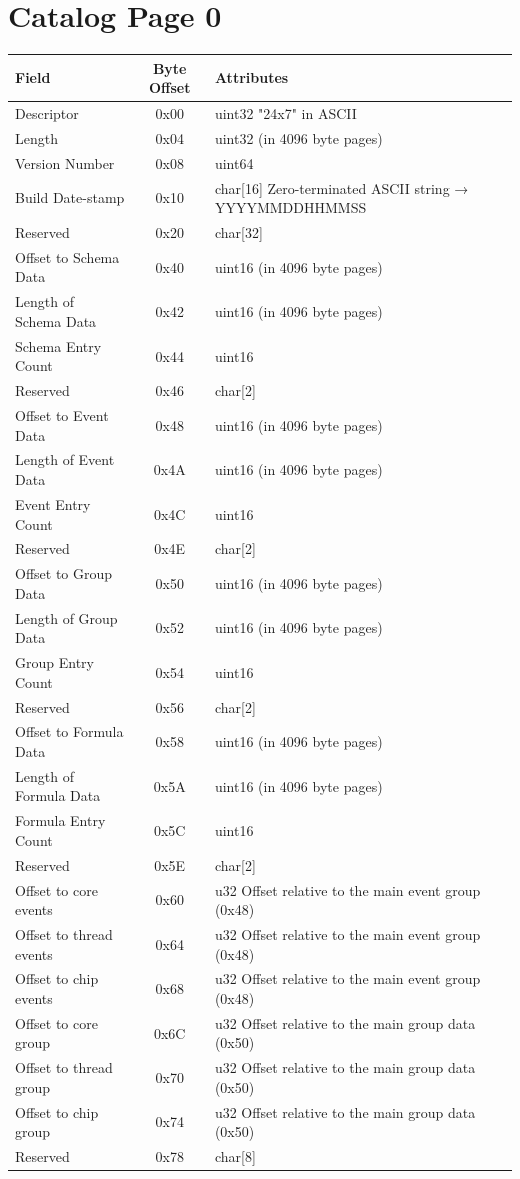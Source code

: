 \documentclass[14]{article}
\begin{document}
\section{Catalog Page 0}
\begin{tabular}[l]{|p{5cm}|c|p{7cm}|}
\hline
\textbf{Field} & \textbf{Byte Offset} & \textbf{Attributes} \\
\hline
Descriptor & 0x00 & uint32 "24x7" in ASCII \\
\hline
Length & 0x04 & uint32 (in 4096 byte pages) \\
\hline
Version Number & 0x08 & uint64 \\
\hline
Build Date-stamp & 0x10 & char[16] Zero-terminated ASCII string → YYYYMMDDHHMMSS \\
\hline
Reserved & 0x20 & char[32] \\
\hline
Offset to Schema Data & 0x40 & uint16 (in 4096 byte pages) \\
\hline
Length of Schema Data & 0x42 & uint16 (in 4096 byte pages) \\
\hline
Schema Entry Count & 0x44 & uint16 \\
\hline
Reserved & 0x46 & char[2] \\
\hline
Offset to Event Data & 0x48 & uint16 (in 4096 byte pages) \\
\hline
Length of Event Data & 0x4A & uint16 (in 4096 byte pages) \\
\hline
Event Entry Count & 0x4C & uint16 \\
\hline
Reserved & 0x4E & char[2] \\
\hline
Offset to Group Data & 0x50 & uint16 (in 4096 byte pages) \\
\hline
Length of Group Data & 0x52 & uint16 (in 4096 byte pages) \\
\hline
Group Entry Count & 0x54 & uint16 \\
\hline
Reserved & 0x56 & char[2] \\
\hline
Offset to Formula Data & 0x58 & uint16 (in 4096 byte pages) \\
\hline
Length of Formula Data & 0x5A & uint16 (in 4096 byte pages) \\
\hline
Formula Entry Count & 0x5C & uint16 \\
\hline
Reserved & 0x5E & char[2] \\
\hline
Offset to core events & 0x60 & u32 Offset relative to the main event group (0x48)\\
\hline
Offset to thread events & 0x64 & u32 Offset relative to the main event group (0x48)\\
\hline
Offset to chip events & 0x68 & u32 Offset relative to the main event group (0x48)\\
\hline
Offset to core group & 0x6C & u32 Offset relative to the main group data (0x50) \\
\hline
Offset to thread group & 0x70 & u32 Offset relative to the main group data (0x50) \\
\hline
Offset to chip group & 0x74 & u32 Offset relative to the main group data (0x50) \\
\hline
Reserved & 0x78 & char[8] \\
\hline
\end{tabular}
\end{document}
